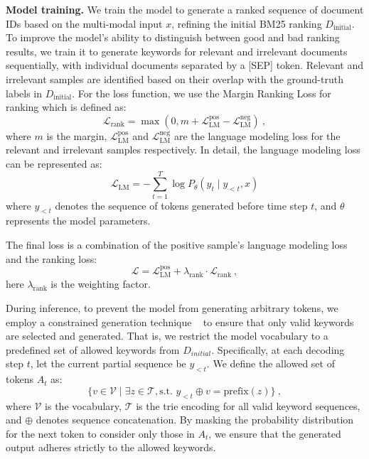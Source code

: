 \documentclass[11pt]{article}
\begin{document}
\noindent \textbf{Model training.}
We train the model to generate a ranked sequence of document IDs based on the multi-modal input \( x \), refining the initial BM25 ranking \( D_{\text{initial}} \). To improve the model's ability to distinguish between good and bad ranking results, we train it to generate keywords for relevant and irrelevant documents sequentially, with individual documents separated by a [SEP] token. Relevant and irrelevant samples are identified based on their overlap with the ground-truth labels in \( D_{\text{initial}} \). For the loss function, we use the Margin Ranking Loss for ranking which is defined as:
\begin{equation}
    \mathcal{L}_{\text{rank}} = \max(0, m + \mathcal{L}_{\text{LM}}^{\text{pos}} - \mathcal{L}_{\text{LM}}^{\text{neg}})~,
\end{equation}
where $m$ is the margin, $\mathcal{L}_{\text{LM}}^{\text{pos}}$ and $\mathcal{L}_{\text{LM}}^{\text{neg}}$ are the language modeling loss for the relevant and irrelevant samples respectively. In detail, the language modeling loss can be represented as:
\begin{equation}
\mathcal{L}_{\text{LM}} = - \sum_{t=1}^{T} \log P_\theta(y_t \mid y_{<t}, x)
\end{equation}
where \(y_{<t}\) denotes the sequence of tokens generated before time step \(t\), and \(\theta\) represents the model parameters.










The final loss is a combination of the positive sample's language modeling loss and the ranking loss: 
\begin{equation}
    \mathcal{L} = \mathcal{L}_{\text{LM}}^{\text{pos}} + \lambda_{\text{rank}} \cdot \mathcal{L}_{\text{rank}}~,
\end{equation}
here $\lambda_{\text{rank}}$ is the weighting factor.

During inference, to prevent the model from generating arbitrary tokens, we employ a constrained generation technique 
~\cite{constraineddecoding} to ensure that only valid keywords are selected and generated. That is, we restrict the model vocabulary to a predefined set of allowed keywords from $D_{initial}$.
Specifically, at each decoding step \( t \), let the current partial sequence be \( y_{<t} \). We define the allowed set of tokens $A_t$ as:
\begin{equation}
\{ v \in \mathcal{V} \mid \exists z \in \mathcal{T}, \text{s.t. } y_{<t} \oplus v =\text{prefix}(z) \}~,
\end{equation}
where \(\mathcal{V}\) is the vocabulary, \(\mathcal{T}\) is the trie encoding for all valid keyword sequences, and \(\oplus\) denotes sequence concatenation. By masking the probability distribution for the next token to consider only those in \( A_t \), we ensure that the generated output adheres strictly to the allowed keywords.
\end{document}
